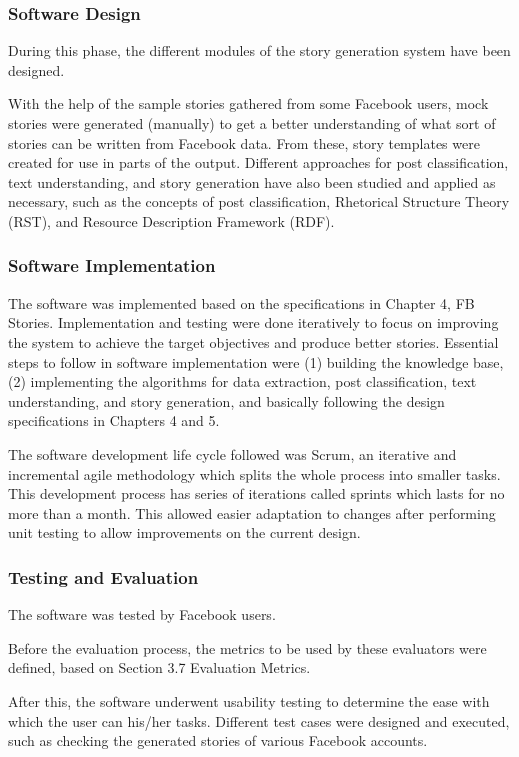 \subsubsection{Software Design}
During this phase, the different modules of the story generation system have been designed. 

With the help of the sample stories gathered from some Facebook users, mock stories were generated (manually) to get a better understanding of what sort of stories can be written from Facebook data. From these, story templates were created for use in parts of the output. Different approaches for post classification, text understanding, and story generation have also been studied and applied as necessary, such as the concepts of post classification, Rhetorical Structure Theory (RST), and Resource Description Framework (RDF).

\subsubsection{Software Implementation}
The software was implemented based on the specifications in Chapter 4, FB Stories. Implementation and testing were done iteratively to focus on improving the system to achieve the target objectives and produce better stories. Essential steps to follow in software implementation were (1) building the knowledge base, (2) implementing the algorithms for data extraction, post classification, text understanding, and story generation, and basically following the design specifications in Chapters 4 and 5.

The software development life cycle followed was Scrum, an iterative and incremental agile methodology which splits the whole process into smaller tasks. This development process has series of iterations called sprints which lasts for no more than a month. This allowed easier adaptation to changes after performing unit testing to allow improvements on the current design.

\subsubsection{Testing and Evaluation}
The software was tested by Facebook users. 

Before the evaluation process, the metrics to be used by these evaluators were defined, based on Section 3.7 Evaluation Metrics.

After this, the software underwent usability testing to determine the ease with which the user can his/her tasks. Different test cases were designed and executed, such as checking the generated stories of various Facebook accounts.

